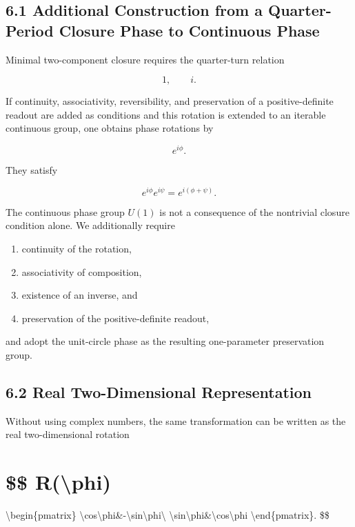 \documentclass[
  a4paper,
  10pt]{article}
\providecommand{\tightlist}{%
  \setlength{\itemsep}{0pt}\setlength{\parskip}{0pt}}
\begin{document}
\subsection{6.1 Additional Construction from a Quarter-Period Closure
Phase to Continuous
Phase}\label{61-additional-construction-from-a-quarter-period-closure-phase-to-continuous-phase}

Minimal two-component closure requires the quarter-turn relation

\[
1,
\qquad
i.
\]

If continuity, associativity, reversibility, and preservation of a
positive-definite readout are added as conditions and this rotation is
extended to an iterable continuous group, one obtains phase rotations by

\[
e^{i\phi}.
\]

They satisfy

\[
e^{i\phi}e^{i\psi}=e^{i(\phi+\psi)}.
\]

The continuous phase group \(U(1)\) is not a consequence of the
nontrivial closure condition alone. We additionally require

\begin{enumerate}
\def\labelenumi{\arabic{enumi}.}
\tightlist
\item
  continuity of the rotation,
\item
  associativity of composition,
\item
  existence of an inverse, and
\item
  preservation of the positive-definite readout,
\end{enumerate}

and adopt the unit-circle phase as the resulting one-parameter
preservation group.

\subsection{6.2 Real Two-Dimensional
Representation}\label{62-real-two-dimensional-representation}

Without using complex numbers, the same transformation can be written as
the real two-dimensional rotation

\section{\$\$ R(\textbackslash phi)}\label{-rphi}

\textbackslash begin\{pmatrix\}
\textbackslash cos\textbackslash phi\&-\textbackslash sin\textbackslash phi\textbackslash{}
\textbackslash sin\textbackslash phi\&\textbackslash cos\textbackslash phi
\textbackslash end\{pmatrix\}. \$\$
\end{document}
